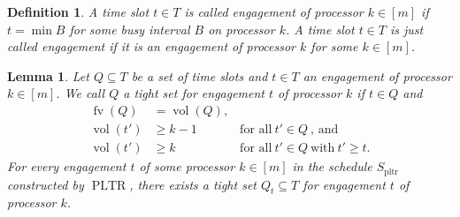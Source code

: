 \documentclass[a4paper]{article}
\DeclareMathOperator{\pltr}{pltr}
\DeclareMathOperator{\PLTR}{PLTR}
\DeclareMathOperator{\fv}{fv}
\DeclareMathOperator{\vol}{vol}
\newtheorem{lemma}[theorem]{Lemma}
\newtheorem{definition}[theorem]{Definition}
\begin{document}
\begin{definition}
  A time slot $t \in T$ is called \emph{engagement of processor $k \in [m]$} if $t = \min B$ for some busy interval $B$ on processor $k$.
  A time slot $t \in T$ is just called \emph{engagement} if it is an engagement of processor $k$ for some $k \in [m]$.
\end{definition}
\begin{lemma}\label{lemma:critical}
  Let $Q \subseteq T$ be a set of time slots and $t \in T$ an engagement of processor $k \in [m]$.
  We call $Q$ a \emph{tight set for engagement $t$ of processor $k$} if $t \in Q$ and
  \begin{align}
    \fv(Q) &= \vol(Q) \text{,}\\
    \vol(t') &\geq k-1 &~\text{for all}~t' \in Q~\text{, and}\\
    \vol(t') &\geq k &~\text{for all}~t' \in Q~\text{with}~t' \geq t \text{.}
  \end{align}
  For every engagement $t$ of some processor $k \in [m]$ in the schedule $S_{\pltr}$ constructed by $\PLTR$, there exists a tight set $Q_t \subseteq T$ for engagement $t$ of processor $k$.
\end{lemma}
\end{document}
